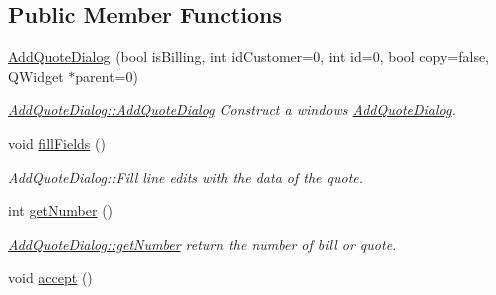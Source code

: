 \subsection*{Public Member Functions}
\begin{DoxyCompactItemize}
\item 
\hyperlink{classGui_1_1Dialogs_1_1AddQuoteDialog_acd7cc49da87e4bbe0317dc1e5f3d58cb}{Add\+Quote\+Dialog} (bool is\+Billing, int id\+Customer=0, int id=0, bool copy=false, Q\+Widget $\ast$parent=0)
\begin{DoxyCompactList}\small\item\em \hyperlink{classGui_1_1Dialogs_1_1AddQuoteDialog_acd7cc49da87e4bbe0317dc1e5f3d58cb}{Add\+Quote\+Dialog\+::\+Add\+Quote\+Dialog} Construct a windows \hyperlink{classGui_1_1Dialogs_1_1AddQuoteDialog}{Add\+Quote\+Dialog}. \end{DoxyCompactList}\item 
\hypertarget{classGui_1_1Dialogs_1_1AddQuoteDialog_a5dd0cca14b1172a7e1dd9019d8fa8ff3}{}void \hyperlink{classGui_1_1Dialogs_1_1AddQuoteDialog_a5dd0cca14b1172a7e1dd9019d8fa8ff3}{fill\+Fields} ()\label{classGui_1_1Dialogs_1_1AddQuoteDialog_a5dd0cca14b1172a7e1dd9019d8fa8ff3}

\begin{DoxyCompactList}\small\item\em Add\+Quote\+Dialog\+::\+Fill line edits with the data of the quote. \end{DoxyCompactList}\item 
int \hyperlink{classGui_1_1Dialogs_1_1AddQuoteDialog_a68b6b01e0818cb6615b2335d486aac09}{get\+Number} ()
\begin{DoxyCompactList}\small\item\em \hyperlink{classGui_1_1Dialogs_1_1AddQuoteDialog_a68b6b01e0818cb6615b2335d486aac09}{Add\+Quote\+Dialog\+::get\+Number} return the number of bill or quote. \end{DoxyCompactList}\item 
\hypertarget{classGui_1_1Dialogs_1_1AddQuoteDialog_abcc6fc79a513dd1765a4494d9499586b}{}void \hyperlink{classGui_1_1Dialogs_1_1AddQuoteDialog_abcc6fc79a513dd1765a4494d9499586b}{accept} ()\label{classGui_1_1Dialogs_1_1AddQuoteDialog_abcc6fc79a513dd1765a4494d9499586b}


\end{DoxyCompactItemize}

